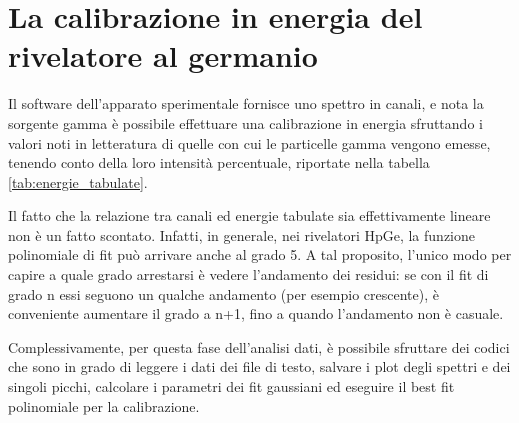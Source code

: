 \documentclass{article}
\begin{document}
    \newpage
    \section{La calibrazione in energia del rivelatore al germanio}
        Il software dell'apparato sperimentale fornisce uno spettro in canali, e nota la sorgente gamma è possibile effettuare una calibrazione in energia sfruttando i valori noti in letteratura di quelle con cui le particelle gamma vengono emesse, tenendo conto della loro intensità percentuale, riportate nella tabella \ref{tab:energie_tabulate}.

        Il fatto che la relazione tra canali ed energie tabulate sia effettivamente lineare non è un fatto scontato. Infatti, in generale, nei rivelatori HpGe, la funzione polinomiale di fit può arrivare anche al grado 5. A tal proposito, l'unico modo per capire a quale grado arrestarsi è vedere l'andamento dei residui: se con il fit di grado n essi seguono un qualche andamento (per esempio crescente), è conveniente aumentare il grado a n+1, fino a quando l'andamento non è casuale.

        Complessivamente, per questa fase dell'analisi dati, è possibile sfruttare dei codici che sono in grado di leggere i dati dei file di testo, salvare i plot degli spettri e dei singoli picchi, calcolare i parametri dei fit gaussiani ed eseguire il best fit polinomiale per la calibrazione.
                
\end{document}
